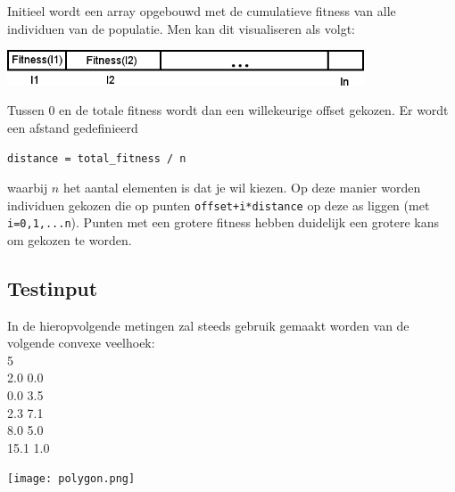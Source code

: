 \documentclass[]{article}
\begin{document}
\noindent Initieel wordt een array opgebouwd met de cumulatieve fitness van alle individuen van de populatie.
Men kan dit visualiseren als volgt:
\begin{center}\includegraphics[width=400px]{SUS.png}\end{center}
Tussen 0 en de totale fitness wordt dan een willekeurige offset gekozen. Er wordt een afstand gedefinieerd
\begin{center}\texttt{distance = total\_fitness / n}\end{center}
waarbij $n$ het aantal elementen is dat je wil kiezen. Op deze manier worden individuen gekozen die op punten \texttt{offset+i*distance} op deze as liggen (met \texttt{i=0,1,...n}).
Punten met een grotere fitness hebben duidelijk een grotere kans om gekozen te worden.

\subsection{Testinput}
In de hieropvolgende metingen zal steeds gebruik gemaakt worden van de volgende convexe veelhoek:\\[10pt]
5\\
2.0 0.0\\
0.0 3.5\\
2.3 7.1\\
8.0 5.0\\
15.1 1.0\\
\begin{center}\texttt{[image: polygon.png]}\end{center}
\end{document}
